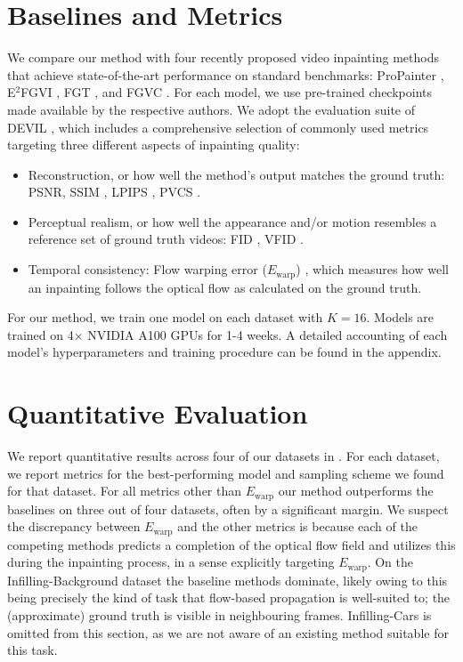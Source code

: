 \section{Baselines and Metrics} 
We compare our method with four recently proposed video inpainting methods that achieve state-of-the-art performance on standard benchmarks: ProPainter \cite{propainter}, E$^2$FGVI \cite{endtoend}, FGT \cite{fgt}, and FGVC \cite{flowedgeguided}. For each model, we use pre-trained checkpoints made available by the respective authors. We adopt the evaluation suite of DEVIL \cite{devil}, which includes a comprehensive selection of commonly used metrics targeting three different aspects of inpainting quality:
\begin{itemize}
    \item Reconstruction, or how well the method's output matches the ground truth: PSNR, SSIM \cite{ssim}, LPIPS \cite{lpips}, PVCS \cite{devil}. 
    \item Perceptual realism, or how well the appearance and/or motion resembles a reference set of ground truth videos: FID \cite{fid}, VFID \cite{vfid}.
    \item Temporal consistency: Flow warping error ($E_\text{warp}$) \cite{ewarp}, which measures how well an inpainting follows the optical flow as calculated on the ground truth. 
\end{itemize} 
For our method, we train one model on each dataset with $K=16$. Models are trained on 4$\times$ NVIDIA A100 GPUs for 1-4 weeks. A detailed accounting of each model's hyperparameters and training procedure can be found in the appendix.

\section{Quantitative Evaluation}
We report quantitative results across four of our datasets in . For each dataset, we report metrics for the best-performing model and sampling scheme we found for that dataset. For all metrics other than $E_\text{warp}$ our method outperforms the baselines on three out of four datasets, often by a significant margin. We suspect the discrepancy between $E_\text{warp}$ and the other metrics is because each of the competing methods predicts a completion of the optical flow field and utilizes this during the inpainting process, in a sense explicitly targeting $E_\text{warp}$. On the Infilling-Background dataset the baseline methods dominate, likely owing to this being precisely the kind of task that flow-based propagation is well-suited to; the (approximate) ground truth is visible in neighbouring frames. Infilling-Cars is omitted from this section, as we are not aware of an existing method suitable for this task. 
